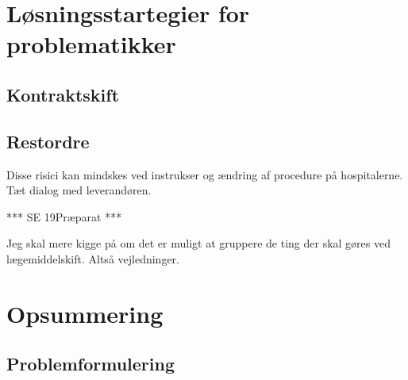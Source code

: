 \section{Løsningsstartegier for problematikker}

\subsection{Kontraktskift}

\subsection{Restordre}
Disse risici kan mindskes ved instrukser og ændring af procedure på hospitalerne.
Tæt dialog med leverandøren.

*** SE 19Præparat ***

Jeg skal mere kigge på om det er muligt at gruppere de ting der skal gøres ved lægemiddelskift. Altså vejledninger. 


\section{Opsummering}
\subsection{Problemformulering}